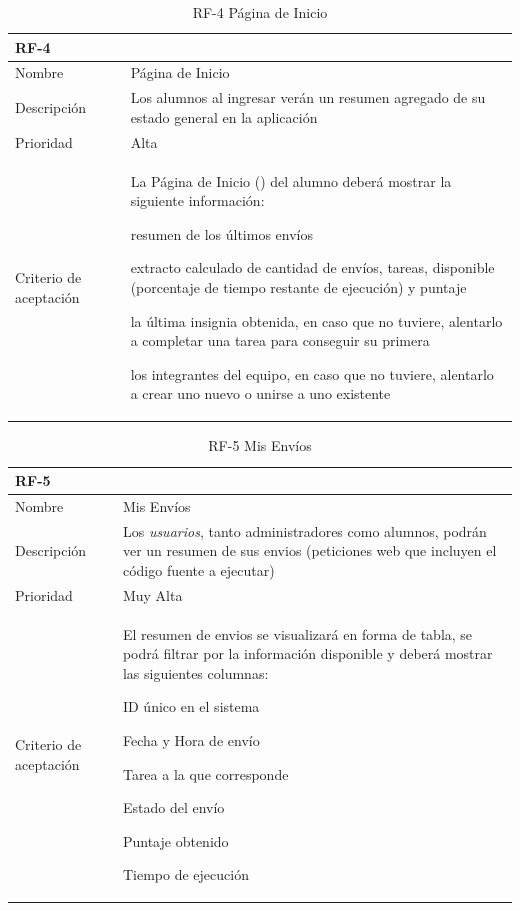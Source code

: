 \documentclass[11pt,spanish,listoffigures,listoftables]{tfgetsinf}
\begin{document}
\begin{table}[!ht]
	\centering
	\begin{tabular}{ |p{4cm}||p{10cm}|  }
		\multicolumn{2}{l}{\textbf{RF-4}} \\
		\hline
		Nombre & Página de Inicio\\
		\hline
		Descripción & Los \gls{alumno}s al ingresar verán un resumen agregado de su estado general en la aplicación   \\
		\hline
		Prioridad &  Alta\\
		\hline
		Criterio de aceptación & La Página de Inicio (\foreign{english}{Dashboard}) del \gls{alumno} deberá mostrar la siguiente información: \newline
		\begin{tabitem}
			\item resumen de los últimos envíos
			\item extracto calculado de cantidad de envíos, tareas, \foreign{english}{quota} disponible (porcentaje de tiempo restante de ejecución) y puntaje
			\item la última insignia obtenida, en caso que no tuviere, alentarlo a completar una tarea para conseguir su primera
			\item los integrantes del equipo, en caso que no tuviere, alentarlo a crear uno nuevo o unirse a uno existente
		\end{tabitem} \\
		\hline
	\end{tabular}
	\caption{RF-4 Página de Inicio}
	\label{table:4}
\end{table}

\begin{table}[ht!]
	\centering
	\begin{tabular}{ |p{4cm}||p{10cm}|  }
		\multicolumn{2}{l}{\textbf{RF-5}} \\
		\hline
		Nombre & Mis Envíos \\
		\hline
		Descripción & Los \textit{usuarios}, tanto \gls{administrador}es como \gls{alumno}s, podrán ver un resumen de sus \gls{envio}s (peticiones web que incluyen el código fuente a ejecutar) \\
		\hline
		Prioridad & Muy Alta\\
		\hline
		Criterio de aceptación & El resumen de \gls{envio}s se visualizará en forma de tabla, se podrá filtrar por la información disponible y deberá mostrar las siguientes columnas: \newline
		\begin{tabitem}
			\item ID único en el sistema
			\item Fecha y Hora de envío
			\item Tarea a la que corresponde
			\item Estado del envío
			\item Puntaje obtenido
			\item Tiempo de ejecución
		\end{tabitem} \\
		\hline
	\end{tabular}
	\caption{RF-5 Mis Envíos}
	\label{table:5}
\end{table}
\end{document}
